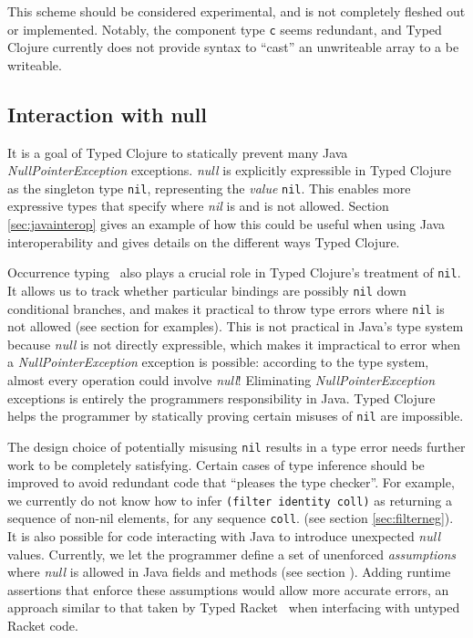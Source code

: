 This scheme should be considered experimental, and is not completely fleshed out or implemented.
Notably, the component type \lstinline|c| seems redundant, and Typed Clojure currently
does not provide syntax to ``cast'' an unwriteable array to a be writeable.

\subsection{Interaction with null}
\label{sec:interactionnull}

It is a goal of Typed Clojure to statically prevent many Java \emph{NullPointerException}
exceptions.
\emph{null} is explicitly expressible in Typed Clojure as the singleton type \lstinline|nil|,
representing the \emph{value} \lstinline|nil|.
This enables more expressive types that specify where \emph{nil} is and is not allowed.
Section \ref{sec:javainterop} gives an example of how this could be useful 
when using Java interoperability and gives details on the different ways Typed Clojure.

Occurrence typing~\cite{TF10} also plays a crucial role in Typed Clojure's
treatment of \lstinline|nil|.
It allows us to track whether particular bindings are possibly \lstinline|nil|
down conditional branches, and makes it practical to throw type errors 
where \lstinline|nil| is not allowed (see section \label{sec:OccurrenceTyping} for examples).
This is not practical in Java's type system because \emph{null} is not directly
expressible, which makes it impractical to error when a \emph{NullPointerException}
exception is possible: according to the type system, almost every operation
could involve \emph{null}!
Eliminating \emph{NullPointerException} exceptions is entirely the programmers
responsibility in Java.
Typed Clojure helps the programmer by statically proving certain misuses of \lstinline|nil| are impossible.

The design choice of potentially misusing \lstinline|nil| results in a type error
needs further work to be completely satisfying.
Certain cases of type inference should be improved to avoid redundant code
that ``pleases the type checker''.
For example, we currently do not know how to infer \lstinline|(filter identity coll)|
as returning a sequence of non-nil elements, for any sequence \lstinline|coll|.
(see section \ref{sec:filterneg}).
It is also possible for code interacting with Java to introduce unexpected \emph{null}
values. Currently, we let the programmer define a set of unenforced \emph{assumptions}
where \emph{null} is allowed in Java fields and methods (see section \label{sec:javainterop}).
Adding runtime assertions that enforce these assumptions would allow more
accurate errors, an approach similar to that taken by Typed Racket~\cite{Tob10} when
interfacing with untyped Racket code.

